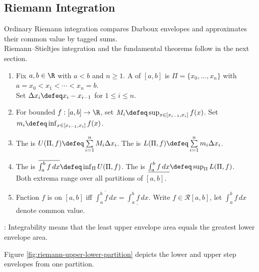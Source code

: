 \subsection{Riemann Integration}

Ordinary Riemann integration compares Darboux envelopes and approximates their common value by tagged sums.\\
Riemann--Stieltjes integration and the fundamental theorems follow in the next section.

\begin{definition} \label{def:partition-and-riemann-upper-lower-sums} 
\begin{enumerate}[label=(\roman*)]
\setlength{\itemsep}{0pt}
\item Fix $a,b\in\R$ with $a<b$ and $n\geq1$. A  of $[a,b]$ is $\Pi=\{x_0,\ldots,x_n\}$ with $a=x_0<x_1<\cdots<x_n=b$.\\
Set $\Delta x_i\defeq x_i-x_{i-1}$ for $1\leq i\leq n$.
\item For bounded $f:[a,b]\to\R$, set $M_i\defeq\sup_{x\in[x_{i-1},x_i]}f(x)$. Set $m_i\defeq\inf_{x\in[x_{i-1},x_i]}f(x)$.
\item The  is $U(\Pi,f)\defeq\sum\limits_{i=1}^{n}M_i\Delta x_i$. The  is $L(\Pi,f)\defeq\sum\limits_{i=1}^{n}m_i\Delta x_i$.
\item The  is $\overline{\int_a^b f\,dx}\defeq\inf_{\Pi}U(\Pi,f)$. The  is $\underline{\int_a^b f\,dx}\defeq\sup_{\Pi}L(\Pi,f)$.\\
Both extrema range over all partitions of $[a,b]$.
\item Fnction $f$ is  on $[a,b]$ iff $\overline{\int_a^b f\,dx}=\underline{\int_a^b f\,dx}$. Write $f\in\mathcal{R}[a,b]$, let $\int_a^b f\,dx$ denote  common value.
\end{enumerate}
: Integrability means that the least upper envelope area equals the greatest lower envelope area.
\end{definition}

\noindent Figure \ref{fig:riemann-upper-lower-partition} depicts the lower and upper step envelopes from one partition.

\begin{illustrationfigure}[H]
  \centering
  
  \caption{On each partition interval, the infimum and supremum of $f$ determine the lower and upper rectangle heights.}
  \label{fig:riemann-upper-lower-partition}
\end{illustrationfigure}

